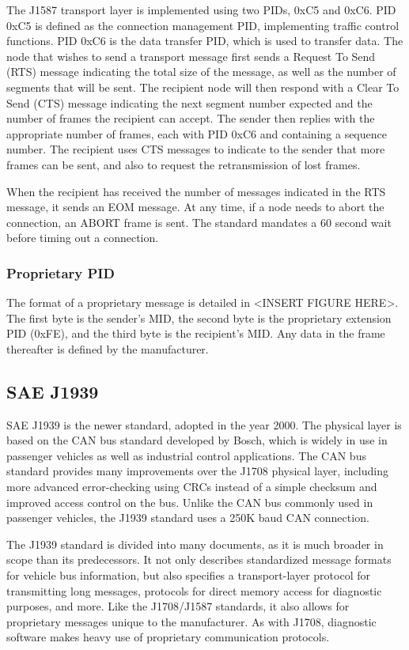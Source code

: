 The J1587 transport layer is implemented using two PIDs, 0xC5 and 0xC6. PID 0xC5 is defined as the connection management PID, implementing traffic control
functions. PID 0xC6 is the data transfer PID, which is used to transfer data. The node that wishes to send a transport message first sends a Request To Send
(RTS) message indicating the total size of the message, as well as the number of segments that will be sent. The recipient node will then respond with a 
Clear To Send (CTS) message indicating the next segment number expected and the number of frames the recipient can accept. The sender then replies with
the appropriate number of frames, each with PID 0xC6 and containing a sequence number. The recipient uses CTS messages to indicate to the sender that
more frames can be sent, and also to request the retransmission of lost frames.

When the recipient has received the number of messages indicated in the RTS message, it sends an EOM message. At any time, if a node needs to abort the
connection, an ABORT frame is sent. The standard mandates a 60 second wait before timing out a connection.

\subsubsection{Proprietary PID}

The format of a proprietary message is detailed in <INSERT FIGURE HERE>. The first byte is the sender's MID, the second byte is the
proprietary extension PID (0xFE), and the third byte is the recipient's MID. Any data in the frame thereafter is defined by the manufacturer.

\subsection{SAE J1939}

SAE J1939\cite{J1939-71} is the newer standard, adopted in the year 2000. The physical layer is based on the CAN bus standard developed by Bosch, which is widely in use
in passenger vehicles as well as industrial control applications. The CAN bus standard provides many improvements over the J1708 physical layer,
including more advanced error-checking using CRCs instead of a simple checksum and improved access control on the bus. Unlike the CAN bus commonly used in
passenger vehicles, the J1939 standard uses a 250K baud CAN connection.

The J1939 standard is divided into many documents, as it is much broader in scope than its predecessors. It not only describes standardized
message formats for vehicle bus information, but also specifies a transport-layer protocol for transmitting long messages, protocols for
direct memory access for diagnostic purposes, and more. Like the J1708/J1587 standards, it also allows for proprietary messages unique
to the manufacturer. As with J1708, diagnostic software makes heavy use of proprietary communication protocols.


